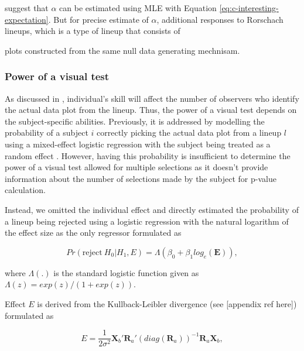 \documentclass[]{interact}
\theoremstyle{plain}%
\theoremstyle{definition}
\theoremstyle{remark}
\begin{document}
\citet{vanderplas2021statistical} suggest that \(\alpha\) can be
estimated using MLE with Equation \ref{eq:c-interesting-expectation}.
But for precise estimate of \(\alpha\), additional responses to
Rorschach lineups, which is a type of lineup that consists of

plots constructed from the same null data generating mechnisam.

\hypertarget{power-of-a-visual-test}{%
\subsubsection{Power of a visual test}\label{power-of-a-visual-test}}

As discussed in \citet{majumder_validation_2013}, individual's skill
will affect the number of observers who identify the actual data plot
from the lineup. Thus, the power of a visual test depends on the
subject-specific abilities. Previously, it is addressed by modelling the
probability of a subject \(i\) correctly picking the actual data plot
from a lineup \(l\) using a mixed-effect logistic regression with the
subject being treated as a random effect
\citep{majumder_validation_2013}. However, having this probability is
insufficient to determine the power of a visual test allowed for
multiple selections as it doesn't provide information about the number
of selections made by the subject for p-value calculation.

Instead, we omitted the individual effect and directly estimated the
probability of a lineup being rejected using a logistic regression with
the natural logarithm of the effect size as the only regressor
formulated as

\begin{equation} \label{eq:logistic-regression-1-1}
Pr(\text{reject}~H_0|H_1,E) = \Lambda(\beta_0 + \beta_1 log_e(\boldsymbol{E})),
\end{equation}

\noindent where \(\Lambda(.)\) is the standard logistic function given
as \(\Lambda(z) = exp(z)/(1+exp(z))\).

Effect \(E\) is derived from the Kullback-Leibler divergence (see
{[}appendix ref here{]}) formulated as

\begin{equation} \label{eq:effect-size-ex1}
E = \frac{1}{2\sigma^2}\boldsymbol{X}_b'\boldsymbol{R}_a'(diag(\boldsymbol{R}_a))^{-1}\boldsymbol{R}_a\boldsymbol{X}_b,
\end{equation}
\end{document}
